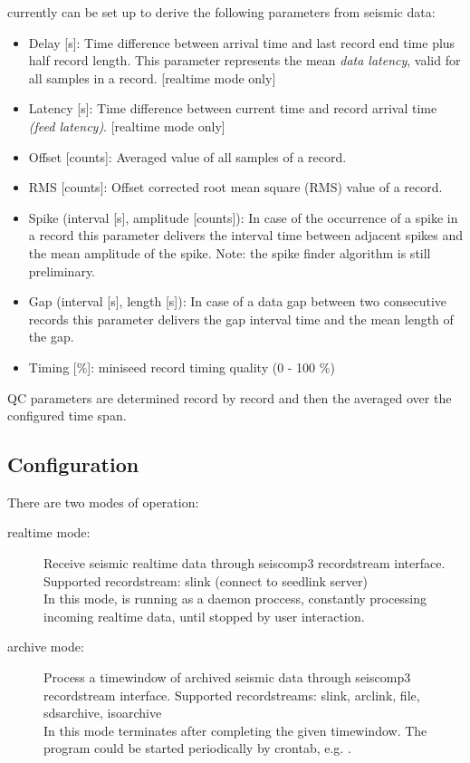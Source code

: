 \noindent
{} currently can be set up to derive the following parameters from seismic data:
\begin{itemize}

\item Delay [s]: Time difference between arrival time and last record end time plus half record length. This parameter represents the mean \textit{data latency}, valid for all samples in a record. [realtime mode only]

\item Latency [s]: Time difference between current time and record arrival time \textit{(feed latency)}.  [realtime mode only]

\item Offset [counts]: Averaged value of all samples of a record.

\item RMS [counts]: Offset corrected root mean square (RMS) value of a record.

\item Spike (interval [s], amplitude [counts]): In case of the occurrence of a spike in a record this parameter delivers the interval time between adjacent spikes and the mean amplitude of the spike. Note: the spike finder algorithm is still preliminary.

\item Gap (interval [s], length [s]): In case of a data gap between two consecutive records this parameter delivers the gap interval time and the mean length of the gap.

\item Timing [\%]: miniseed record timing quality (0 - 100 \%) 
\end{itemize}
\noindent
QC parameters are determined record by record and then the averaged over the configured time span.\\

\subsection{Configuration}

\noindent
There are two modes of operation:
\begin{description}
\item[realtime mode: ] Receive seismic realtime data through seiscomp3 recordstream interface. Supported recordstream: slink (connect to seedlink server)\\
In this mode,  is running as a daemon proccess, constantly processing incoming realtime data, until stopped by user interaction.

\item[archive mode: ] Process a timewindow of archived seismic data through seiscomp3 recordstream interface. Supported recordstreams: slink, arclink, file, sdsarchive, isoarchive\\
In this mode  terminates after completing the given timewindow. The program could be started periodically by crontab, e.g. .
\end{description}



